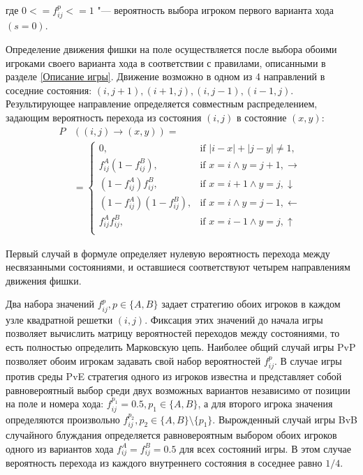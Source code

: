 где $0 <= f_{ij}^p <= 1$ "--- вероятность выбора игроком первого варианта хода $(s=0)$.

Определение движения фишки на поле осуществляется после выбора обоими игроками своего варианта хода в соответствии с правилами,
описанными в разделе \cref{Описание игры}. Движение возможно в одном из 4 направлений в соседние состояния:
$(i, j + 1), (i + 1, j), (i, j - 1), (i - 1, j)$. Результирующее направление определяется совместным распределением, 
задающим вероятность перехода из состояния $(i, j)$ в состояние $(x, y)$:
\begin{equation}
    \begin{aligned}
    P& \left( (i, j) \rightarrow (x, y) \right) = \\
    &=\begin{cases}
        0, &\mbox{if } |i-x|+|j-y| \neq 1,\\ 
        f_{ij}^A \left(1-f_{ij}^B\right), &\mbox{if } x=i \land y=j+1, \boldsymbol{\rightarrow}\\
        \left(1-f_{ij}^A\right) f_{ij}^B, &\mbox{if } x=i+1 \land y=j, \boldsymbol{\downarrow}\\
        \left(1-f_{ij}^A\right) \left(1-f_{ij}^B\right), &\mbox{if } x=i \land y=j-1, \boldsymbol{\leftarrow}\\
        f_{ij}^A f_{ij}^B, &\mbox{if } x=i-1 \land y=j, \boldsymbol{\uparrow}\\
    \end{cases}
    \label{eq:transition}
    \end{aligned}
\end{equation}

Первый случай в формуле определяет нулевую вероятность перехода между несвязанными состояниями, и оставшиеся соответствуют четырем направлениям движения фишки.

Два набора значений $f_{ij}^p, p \in \{A, B\}$ задает стратегию обоих игроков в каждом узле квадратной решетки $(i, j)$. 
Фиксация этих значений до начала игры позволяет вычислить матрицу вероятностей переходов между состояниями, то есть полностью определить Марковскую цепь.
Наиболее общий случай игры PvP позволяет обоим игрокам задавать свой набор вероятностей $f_{ij}^p$. В случае игры против среды PvE
стратегия одного из игроков известна и представляет собой равновероятный выбор среди двух возможных вариантов независимо от позиции на поле и номера хода:
$f_{ij}^{p_1} = 0.5, p_1 \in \{A, B\}$, а для второго игрока значения определяются произвольно $f_{ij}^{p_2}, p_2 \in \{A, B\} \setminus \{p_1\}$. 
Вырожденный случай игры BvB случайного блуждания определяется равновероятным выбором обоих игроков одного из вариантов хода $f_{ij}^{A} = f_{ij}^{B} = 0.5$
для всех состояний игры. В этом случае вероятность перехода из каждого внутреннего состояния в соседнее равно $1/4$.

